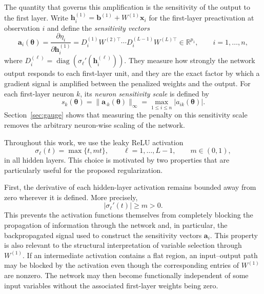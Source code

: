 \documentclass[twoside,11pt]{article}
\newcommand{\bth}{\boldsymbol{\theta}}
\newcommand{\ba}{\mathbf{a}}
\newcommand{\bx}{\mathbf{x}}
\newcommand{\Wone}{W^{(1)}}
\newcommand{\R}{\mathbb{R}}
\begin{document}
The quantity that governs this amplification is the sensitivity of the output to the first layer. Write $\mathbf{h}^{(1)}_i = \mathbf{b}^{(1)} + \Wone\bx_i$ for the first-layer preactivation at observation $i$ and define the \emph{sensitivity vectors}
\begin{equation}\label{eq:obs-sensitivity}
    \ba_i(\bth)=\frac{\partial \eta_i}{\partial\mathbf{h}^{(1)}_i}=D_i^{(1)}W^{(2)\top}\cdots D_i^{(L-1)} W^{(L)\top}\in\R^{p_1},
    \qquad i=1,\ldots,n ,
\end{equation}
where $D_i^{(\ell)}=\operatorname{diag}\left(\sigma_\ell '\left(\mathbf{h}^{(\ell)}_i\right)\right)$. They measure how strongly the network output responds to each first-layer unit, and they are the exact factor by which a gradient signal is amplified between the penalized weights and the output. For each first-layer neuron $k$, its \emph{neuron sensitivity scale} is defined by
\begin{equation}\label{eq:neuron-sensitivity-scale}
    s_k(\bth)=\|\ba_{\cdot k}(\bth)\|_\infty=\max_{1\leq i\leq n}|a_{ik}(\bth)|.
\end{equation}
Section~\ref{sec:gauge} shows that measuring the penalty on this sensitivity scale removes the arbitrary neuron-wise scaling of the network.

Throughout this work, we use the leaky ReLU activation
\begin{equation*}
    \sigma_\ell(t)=\max\{t,mt\},\qquad
    \ell=1,\ldots,L-1,\qquad m\in(0,1),
\end{equation*}
in all hidden layers. This choice is motivated by two properties that are particularly useful for the proposed regularization.

First, the derivative of each hidden-layer activation remains bounded away from zero wherever it is defined. More precisely,
\begin{equation*}
    |\sigma_\ell'(t)| \geq m > 0 .
\end{equation*}
This prevents the activation functions themselves from completely blocking the propagation of information through the network and, in particular, the backpropagated signal used to construct the sensitivity vectors $\ba_i$. This property is also relevant to the structural interpretation of variable selection through $\Wone$. If an intermediate activation contains a flat region, an input--output path may be blocked by the activation even though the corresponding entries of $\Wone$ are nonzero. The network may then become functionally independent of some input variables without the associated first-layer weights being zero.
\end{document}
